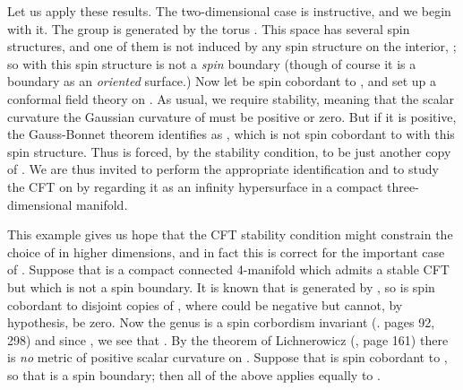 \documentclass[a4paper,12pt]{article}
\theoremstyle{definition}
\renewcommand{\u}{\textit}
\renewcommand{\-}{\myHighlight{$\dfrac{\quad\enspace}{\quad}$}\coordHE{}}
\begin{document}
Let us apply these results. The two-dimensional case is instructive, and we begin with it. The group \coordHE{} is generated by the torus \coordHE{}. This space has several spin structures, and one of them is not induced by any spin structure on the interior, \coordHE{}; so \coordHE{} with this spin structure is not a \u{spin} boundary (though of course it is a boundary as an \u{oriented} surface.) Now let \coordHE{} be spin cobordant to \coordHE{}, and set up a conformal field theory on \coordHE{}. As usual, we require stability, meaning that the scalar curvature \- the Gaussian curvature \- of \coordHE{} must be positive or zero. But if it is positive, the Gauss-Bonnet theorem identifies \coordHE{} as \coordHE{}, which is not spin cobordant to \coordHE{} with this spin structure. Thus \coordHE{} is forced, by the stability condition, to be just another copy of \coordHE{}. We are thus invited to perform the appropriate identification and to study the CFT on \coordHE{} by regarding it as an infinity hypersurface in a compact three-dimensional manifold.

This example gives us hope that the CFT stability condition might constrain the choice of \coordHE{} in higher dimensions, and in fact this is correct for the important case of \coordHE{}. Suppose that \coordHE{} is a compact connected 4-manifold which admits a stable CFT but which is not a spin boundary. It is known that \coordHE{} is generated by \coordHE{}, so \coordHE{} is spin cobordant to \coordHE{} disjoint copies of \coordHE{}, where \coordHE{} could be negative but cannot, by hypothesis, be zero. Now the \coordHE{} genus is a spin corbordism invariant (\cite{12}. pages 92, 298) and since \coordHE{}, we see that \coordHE{}. By the theorem of Lichnerowicz (\cite{12}, page 161) there is \u{no} metric of positive scalar curvature on \coordHE{}. Suppose that \coordHE{} is spin cobordant to \coordHE{}, so that \coordHE{} is a spin boundary; then all of the above applies equally to \coordHE{}.
\end{document}
